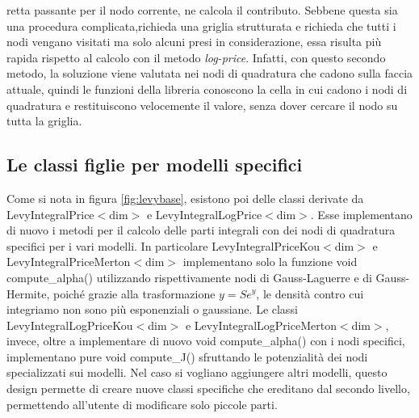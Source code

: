 \documentclass[a4paper,10pt]{report}
\theoremstyle{plain}
\theoremstyle{definition}
\theoremstyle{remark}
\begin{document}
retta passante per il nodo corrente, ne calcola il contributo. Sebbene questa sia una procedura complicata,richieda una griglia strutturata e richieda che tutti i nodi vengano visitati ma solo alcuni presi in considerazione, essa risulta più rapida rispetto al calcolo con il metodo \emph{log-price}. Infatti, con questo secondo metodo, la soluzione viene valutata nei nodi di quadratura che cadono sulla faccia attuale, quindi le funzioni della libreria conoscono la cella in cui cadono i nodi di quadratura e restituiscono velocemente il valore, senza dover cercare il nodo su tutta la griglia.

\subsection{Le classi figlie per modelli specifici}

Come si nota in figura \ref{fig:levybase}, esistono poi delle classi derivate da \textsf{LevyIntegralPrice$<$dim$>$} e \textsf{LevyIntegralLogPrice$<$dim$>$}. Esse implementano di nuovo i metodi per il calcolo delle parti integrali con dei nodi di quadratura specifici per i vari modelli. In particolare \textsf{LevyIntegralPriceKou$<$dim$>$} e \textsf{LevyIntegralPriceMerton$<$dim$>$} implementano solo la funzione \textsf{void compute\_alpha()} utilizzando rispettivamente nodi di Gauss-Laguerre e di Gauss-Hermite, poich\'e grazie alla trasformazione $y=Se^y$, le densit\`a contro cui integriamo non sono pi\`u esponenziali o gaussiane. Le classi \textsf{LevyIntegralLogPriceKou$<$dim$>$} e {LevyIntegralLogPriceMerton$<$dim$>$}, invece, oltre a implementare di nuovo \textsf{void compute\_alpha()} con i nodi specifici, implementano pure \textsf{void compute\_J()} sfruttando le potenzialit\`a dei nodi specializzati sui modelli. Nel caso si vogliano aggiungere altri modelli, questo design permette di creare nuove classi specifiche che ereditano dal secondo livello, permettendo all'utente di modificare solo piccole parti.
\end{document}
